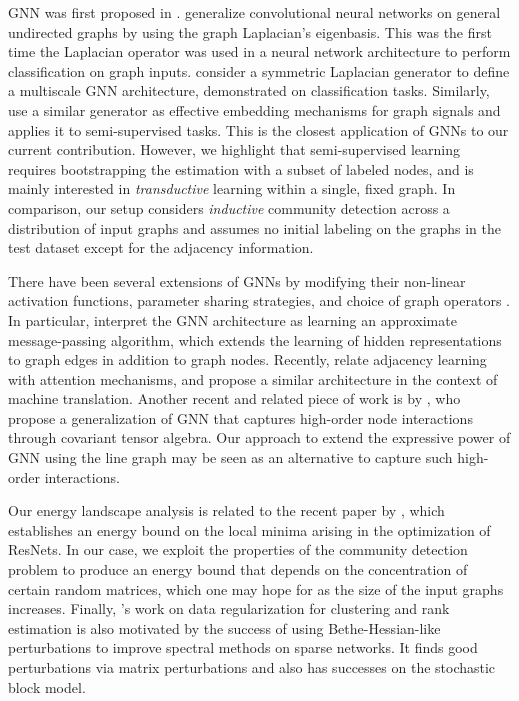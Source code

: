 \documentclass{article} \usepackage{iclr2019_conference,times}
\begin{document}
GNN was first proposed in \cite{gori2005new, GNN}. \cite{Bruna} generalize convolutional neural networks on general undirected graphs by using the graph Laplacian's eigenbasis. This was the first time the Laplacian operator was used in a neural network architecture to perform classification on graph inputs. \cite{defferrard2016convolutional} consider a symmetric Laplacian generator to define a multiscale GNN architecture, demonstrated on classification tasks. Similarly, \cite{kipf2016semi} use a similar generator as effective embedding mechanisms for graph signals and applies it to semi-supervised tasks. 
This is the closest application of GNNs to our current contribution. However, we highlight that semi-supervised 
learning requires bootstrapping the estimation with a subset of labeled nodes, and is mainly interested in \textit{transductive} learning within a single, fixed graph. In comparison, our setup considers \textit{inductive} community detection across a distribution of input graphs and assumes no initial labeling on the graphs in the test dataset except for the adjacency information.



There have been several extensions of GNNs by modifying their non-linear activation functions, parameter sharing strategies, and choice of graph operators \citep{li2015gated, sukhbaatar2016learning,duvenaud2015convolutional,niepert2016learning}.
In particular, \cite{gilmer2017neural} interpret the GNN architecture as learning an approximate message-passing algorithm, which extends the 
learning of hidden representations to graph edges in addition to graph nodes. 
Recently, \cite{velickovic2017graph} relate adjacency learning with attention mechanisms, 
and \cite{vaswani2017attention} propose a similar architecture in the context of machine translation. 
Another recent and related piece of work is by \cite{kondor2018covariant}, who propose 
a generalization of GNN that captures high-order node interactions through covariant tensor algebra. Our approach to extend the expressive power of GNN using the line graph 
may be seen as an alternative to capture such high-order interactions. 

Our energy landscape analysis is related to the recent paper by \cite{shamir2018resnets}, which establishes an energy bound on the local minima arising in the optimization of ResNets. In our case, we exploit the properties of the community detection problem to produce an energy bound that depends on the concentration of certain random matrices, which one may hope for as the size of the input graphs increases.  
Finally, \cite{zhang2016robust}'s work on data regularization for clustering and rank estimation is also motivated by the success of using Bethe-Hessian-like perturbations to improve spectral methods on sparse networks. It finds good perturbations via matrix perturbations and also has successes on the stochastic block model. 
\end{document}
